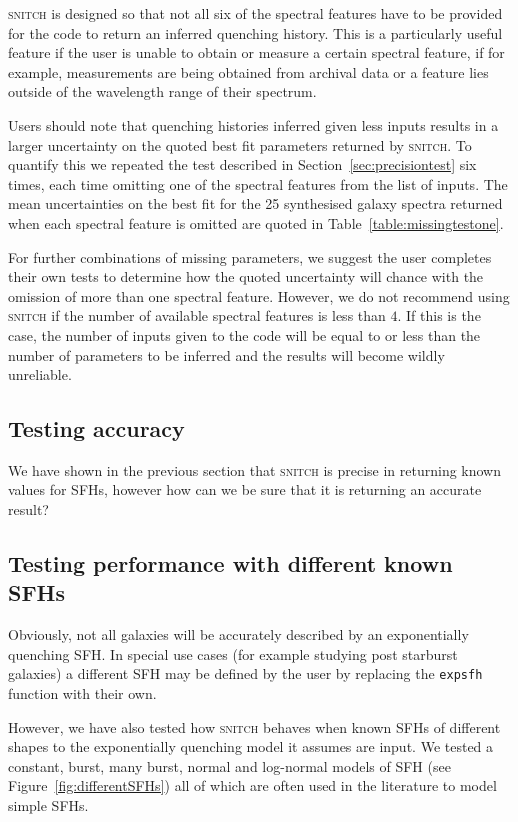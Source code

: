 \documentclass[useAMS,usenatbib]{mn2e}
\begin{document}
\textsc{snitch} is designed so that not all six of the spectral features have to be provided for the code to return an inferred quenching history. This is a particularly useful feature if the user is unable to obtain or measure a certain spectral feature, if for example, measurements are being obtained from archival data or a feature lies outside of the wavelength range of their spectrum. 

Users should note that quenching histories inferred given less inputs results in a larger uncertainty on the quoted best fit parameters returned by \textsc{snitch}. To quantify this we repeated the test described in Section~\ref{sec:precisiontest} six times, each time omitting one of the spectral features from the list of inputs. The mean uncertainties on the best fit for the 25 synthesised galaxy spectra returned when each spectral feature is omitted are quoted in Table~\ref{table:missingtestone}. 

For further combinations of missing parameters, we suggest the user completes their own tests to determine how the quoted uncertainty will chance with the omission of more than one spectral feature. However, we do not recommend using \textsc{snitch} if the number of available spectral features is less than $4$. If this is the case, the number of inputs given to the code will be equal to or less than the number of parameters to be inferred and the results will become wildly unreliable. 

\subsection{Testing accuracy}\label{sec:accuracytest}

We have shown in the previous section that \textsc{snitch} is precise in returning known values for SFHs, however how can we be sure that it is returning an accurate result? 


\subsection{Testing performance with different known SFHs}

Obviously, not all galaxies will be accurately described by an exponentially quenching SFH. In special use cases (for example studying post starburst galaxies) a different SFH may be defined by the user by replacing the \texttt{expsfh} function with their own. 

However, we have also tested how \textsc{snitch} behaves when known SFHs of different shapes to the exponentially quenching model it assumes are input. We tested a constant, burst, many burst, normal and log-normal models of SFH (see Figure~\ref{fig:differentSFHs}) all of which are often used in the literature to model simple SFHs. 
\end{document}
